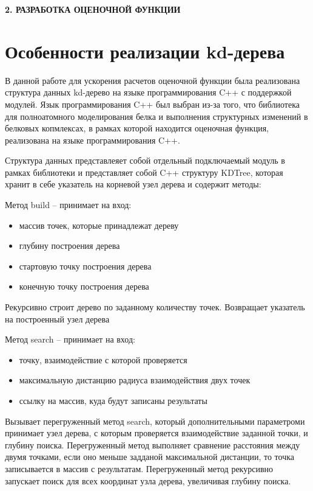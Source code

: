 \newpage
\begin{center}
	\textbf{\large 2. РАЗРАБОТКА ОЦЕНОЧНОЙ ФУНКЦИИ}
\end{center}


\section{Особенности реализации kd-дерева}


В данной работе для ускорения расчетов оценочной функции была реализована структура данных kd-дерево на языке программирования C++ с поддержкой модулей. Язык программирования C++ был выбран из-за того, что библиотека для полноатомного моделирования белка и выполнения структурных изменений в белковых копмлексах, в рамках которой находится оценочная функция, реализована на языке программирования C++.

Структура данных представлеяет собой отдельный подключаемый модуль в рамках библиотеки и представляет собой C++ структуру \newline KDTree, которая хранит в себе указатель на корневой узел дерева и содержит методы:

Метод build -- принимает на вход:

\begin{itemize}
	\item массив точек, которые принадлежат дереву
	\item глубину построения дерева
	\item стартовую точку построения дерева
	\item конечную точку построения дерева
\end{itemize}

Рекурсивно строит дерево по заданному количеству точек. Возвращает указатель на построенный узел дерева

Метод search -- принимает на вход:
\begin{itemize}
	\item точку, взаимодействие с которой проверяется
	\item максимальную дистанцию радиуса взаимодействия двух точек
	\item ссылку на массив, куда будут записаны результаты
\end{itemize}

Вызывает перегруженный метод search, который дополнительными параметроми принимает узел дерева, с которым проверяется взаимодействие заданной точки, и глубину поиска. Перегруженный метод выполняет сравнение расстояния между двумя точками, если оно меньше задданой максимальной дистанции, то точка записывается в массив с результатам. Перегруженный метод рекурсивно запускает поиск для всех координат узла дерева, увеличивая глубину поиска.


